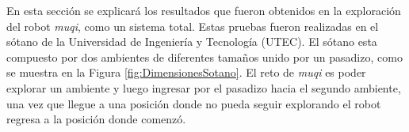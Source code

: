 En esta sección se explicará los resultados que fueron obtenidos en la exploración 
del robot \textit{muqi}, como un sistema total. Estas pruebas fueron realizadas en
el sótano de la Universidad de Ingeniería y Tecnología (UTEC). El sótano esta 
compuesto por dos ambientes de diferentes tamaños unido por un pasadizo, como se 
muestra en la Figura \ref{fig:DimensionesSotano}. El reto de \textit{muqi} es poder 
explorar un ambiente y luego ingresar por el pasadizo hacia el segundo ambiente, una 
vez que llegue a una posición donde no pueda seguir explorando el robot regresa a la 
posición donde comenzó.



